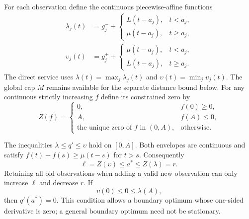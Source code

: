 For each observation define the continuous piecewise-affine functions
\begin{align*}
 \lambda_j(t)&=g_j^-+
 \begin{cases}L(t-a_j),&t<a_j,\\ \mu(t-a_j),&t\ge a_j,\end{cases}\\
 \upsilon_j(t)&=g_j^++
 \begin{cases}\mu(t-a_j),&t<a_j,\\ L(t-a_j),&t\ge a_j.\end{cases}
\end{align*}
The direct service uses
$\lambda(t)=\max_j\lambda_j(t)$ and
$\upsilon(t)=\min_j\upsilon_j(t)$.  The global cap $M$ remains
available for the separate distance bound below.  For any continuous
strictly increasing $f$ define its constrained zero by
\[
 Z(f)=\begin{cases}
 0,&f(0)\ge0,\\
 A,&f(A)\le0,\\
 \text{the unique zero of }f\text{ in }(0,A),&\text{otherwise}.
 \end{cases}
\]

\begin{lemma}
\label{lem:directbracket126}
The inequalities $\lambda\le q'\le\upsilon$ hold on $[0,A]$.
Both envelopes are continuous and satisfy
$f(t)-f(s)\ge\mu(t-s)$ for $t>s$.  Consequently
\begin{equation}\label{eq:directbracket126}
 \ell=Z(\upsilon)\le a^*\le Z(\lambda)=r.
\end{equation}
Retaining all old observations when adding a valid new observation can
only increase $\ell$ and decrease $r$.  If
\begin{equation}\label{eq:stationary126}
 \upsilon(0)\le0\le\lambda(A),
\end{equation}
then $q'(a^*)=0$.  This condition allows a boundary optimum whose
one-sided derivative is zero; a general boundary optimum need not be
stationary.
\end{lemma}

